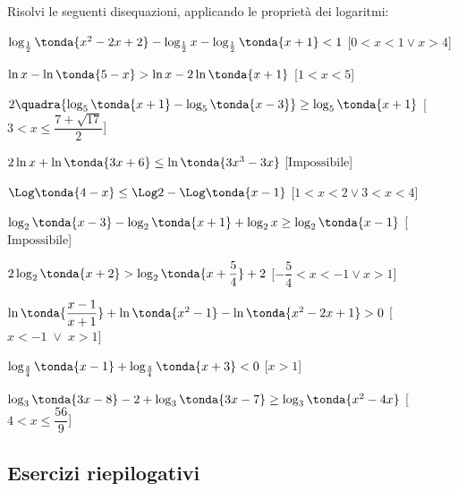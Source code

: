 \begin{esercizio}\label{ese:}
 Risolvi le seguenti disequazioni, applicando le proprietà dei logaritmi:
 \begin{enumeratea}
   \item \(\log_{\frac{1}{2}} \tonda{x^2-2x+2}-\log_{\frac{1}{2}} x- 
\log_{\frac{1}{2}} \tonda{x+1}<1\)
   \hfill [\(0<x<1 \lor x>4\)]
   \item \(\ln x-\ln \tonda{5-x}>\ln x-2\ln  \tonda{x+1}\)
   \hfill [\(1<x<5\)]
   \item \(2 \quadra{\log_5 \tonda{x+1}-\log_5 \tonda{x-3}}\geq\log_5 
\tonda{x+1}\)
   \hfill [\(3<x\leq \dfrac{7+\sqrt{17}}{2}\)]
   \item \(2 \ln x+\ln \tonda{3x+6}\leq\ln \tonda{3x^3-3x}\)
   \hfill [\(\text{Impossibile}\)]
   \item \(\Log \tonda{4-x}\leq\Log 2 -\Log \tonda{x-1}\)
   \hfill [\(1<x<2 \lor 3<x<4\)]
   \item \(\log_2 \tonda{x-3} -\log_2 \tonda{x+1}+\log_2 x \geq \log_2 
\tonda{x-1}\)
   \hfill [\(\text{Impossibile}\)]
   \item \(2 \log_2 \tonda{x+2}>\log_2 \tonda{x+\dfrac{5}{4}}+2\)
   \hfill [\(-\dfrac{5}{4}<x<-1 \lor x >1\)]
   \item \(\ln \tonda{\dfrac{x-1}{x+1}}+\ln \tonda{x^2-1}-\ln 
\tonda{x^2-2x+1}>0\)
   \hfill [\(x<-1 \;\lor\; x>1\)]
   \item \(\log_{\frac{3}{4}} 
\tonda{x-1}+\log_{\frac{3}{4}}\tonda{x+3}<0\)
   \hfill [\(x>1\)]
   \item \(\log_3 \tonda{3x-8}-2+\log_3 \tonda{3x-7}\geq\log_3 
\tonda{x^2-4x}\)
   \hfill [\(4<x\leq\dfrac{56}{9}\)]
 \end{enumeratea}
\end{esercizio}


\subsection{Esercizi riepilogativi}

